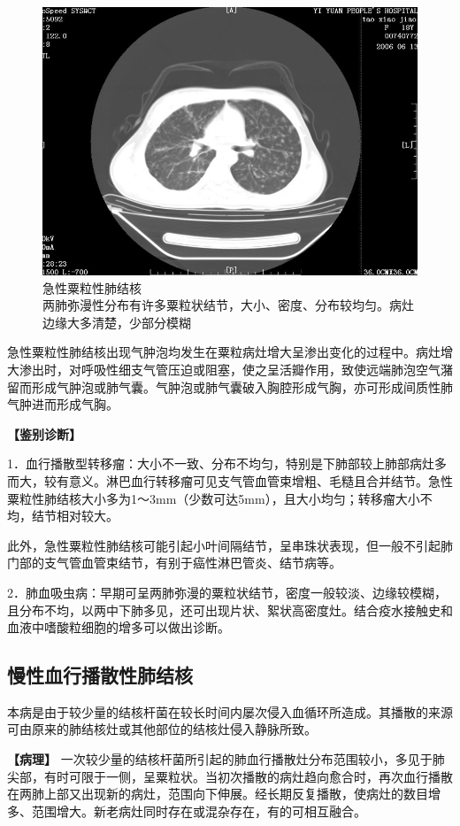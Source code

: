 \begin{figure}[!htbp]
 \centering
 \includegraphics[width=.7\textwidth,height=\textheight,keepaspectratio]{./images/Image00209.jpg}
 \captionsetup{justification=centering}
 \caption{急性粟粒性肺结核\\{\small 两肺弥漫性分布有许多粟粒状结节，大小、密度、分布较均匀。病灶边缘大多清楚，少部分模糊}}
 \label{fig9-22}
  \end{figure} 

急性粟粒性肺结核出现气肿泡均发生在粟粒病灶增大呈渗出变化的过程中。病灶增大渗出时，对呼吸性细支气管压迫或阻塞，使之呈活瓣作用，致使远端肺泡空气潴留而形成气肿泡或肺气囊。气肿泡或肺气囊破入胸腔形成气胸，亦可形成间质性肺气肿进而形成气胸。

\textbf{【鉴别诊断】}

1．血行播散型转移瘤：大小不一致、分布不均匀，特别是下肺部较上肺部病灶多而大，较有意义。淋巴血行转移瘤可见支气管血管束增粗、毛糙且合并结节。急性粟粒性肺结核大小多为1～3mm（少数可达5mm），且大小均匀；转移瘤大小不均，结节相对较大。

此外，急性粟粒性肺结核可能引起小叶间隔结节，呈串珠状表现，但一般不引起肺门部的支气管血管束结节，有别于癌性淋巴管炎、结节病等。

2．肺血吸虫病：早期可呈两肺弥漫的粟粒状结节，密度一般较淡、边缘较模糊，且分布不均，以两中下肺多见，还可出现片状、絮状高密度灶。结合疫水接触史和血液中嗜酸粒细胞的增多可以做出诊断。

\subsection{慢性血行播散性肺结核}

本病是由于较少量的结核杆菌在较长时间内屡次侵入血循环所造成。其播散的来源可由原来的肺结核灶或其他部位的结核灶侵入静脉所致。

\textbf{【病理】}
一次较少量的结核杆菌所引起的肺血行播散灶分布范围较小，多见于肺尖部，有时可限于一侧，呈粟粒状。当初次播散的病灶趋向愈合时，再次血行播散在两肺上部又出现新的病灶，范围向下伸展。经长期反复播散，使病灶的数目增多、范围增大。新老病灶同时存在或混杂存在，有的可相互融合。

